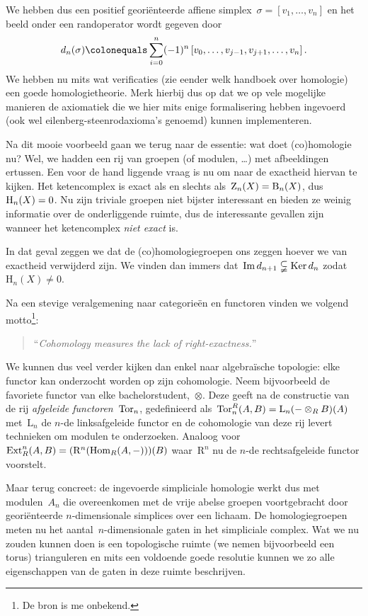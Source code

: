\documentclass[a4paper,11pt,openany,oneside,article]{memoir}
\begin{document}
We hebben dus een positief geori\"enteerde affiene simplex~$\sigma=\left[ v_1,\ldots,v_n \right]$ en het beeld onder een randoperator wordt gegeven door
\begin{equation}
  d_n(\sigma)\colonequals\sum_{i=0}^n(-1)^n\left[ v_0,\ldots,v_{j-1},v_{j+1},\ldots,v_n \right].
\end{equation}
We hebben nu mits wat verificaties (zie eender welk handboek over homologie) een goede homologietheorie. Merk hierbij dus op dat we op vele mogelijke manieren de axiomatiek die we hier mits enige formalisering hebben ingevoerd (ook wel eilenberg-steenrodaxioma's genoemd) kunnen implementeren.

Na dit mooie voorbeeld gaan we terug naar de essentie: wat doet (co)homologie nu? Wel, we hadden een rij van groepen (of modulen, \ldots) met afbeeldingen ertussen. Een voor de hand liggende vraag is nu om naar de exactheid hiervan te kijken. Het ketencomplex is exact als en slechts als~$\mathrm{Z}_n(X)=\mathrm{B}_n(X)$, dus~$\mathrm{H}_n(X)=0$. Nu zijn triviale groepen niet bijster interessant en bieden ze weinig informatie over de onderliggende ruimte, dus de interessante gevallen zijn wanneer het ketencomplex \emph{niet exact} is.

In dat geval zeggen we dat de (co)homologiegroepen ons zeggen hoever we van exactheid verwijderd zijn. We vinden dan immers dat~$\operatorname{Im} d_{n+1}\subsetneqq\operatorname{Ker} d_n$ zodat~$\mathrm{H}_n(X)\neq 0$.

Na een stevige veralgemening naar categorie\"en en functoren vinden we volgend motto\footnote{De bron is me onbekend.}:
\begin{quote}
  ``\textsl{Cohomology measures the lack of right-exactness.}''
\end{quote}

We kunnen dus veel verder kijken dan enkel naar algebra\"ische topologie: elke functor kan onderzocht worden op zijn cohomologie. Neem bijvoorbeeld de favoriete functor van elke bachelorstudent,~$\otimes$. Deze geeft na de constructie van de rij \emph{afgeleide functoren}~$\operatorname{Tor}_n$, gedefinieerd als~$\operatorname{Tor}^R_n(A,B)=\mathrm{L}_n(-\otimes_R B)(A)$ met~$\mathrm{L}_n$ de $n$-de linksafgeleide functor en de cohomologie van deze rij levert technieken om modulen te onderzoeken. Analoog voor~$\operatorname{Ext}^n_R(A,B)=(\mathrm{R}^n(\operatorname{Hom}_R(A,-)))(B)$ waar~$\mathrm{R}^n$ nu de $n$-de rechtsafgeleide functor voorstelt.

Maar terug concreet: de ingevoerde simpliciale homologie werkt dus met modulen~$A_n$ die overeenkomen met de vrije abelse groepen voortgebracht door geori\"enteerde $n$\nobreakdash-dimensionale simplices over een lichaam. De homologiegroepen meten nu het aantal~$n$-dimensionale gaten in het simpliciale complex. Wat we nu zouden kunnen doen is een topologische ruimte (we nemen bijvoorbeeld een torus) trianguleren en mits een voldoende goede resolutie kunnen we zo alle eigenschappen van de gaten in deze ruimte beschrijven.
\end{document}
